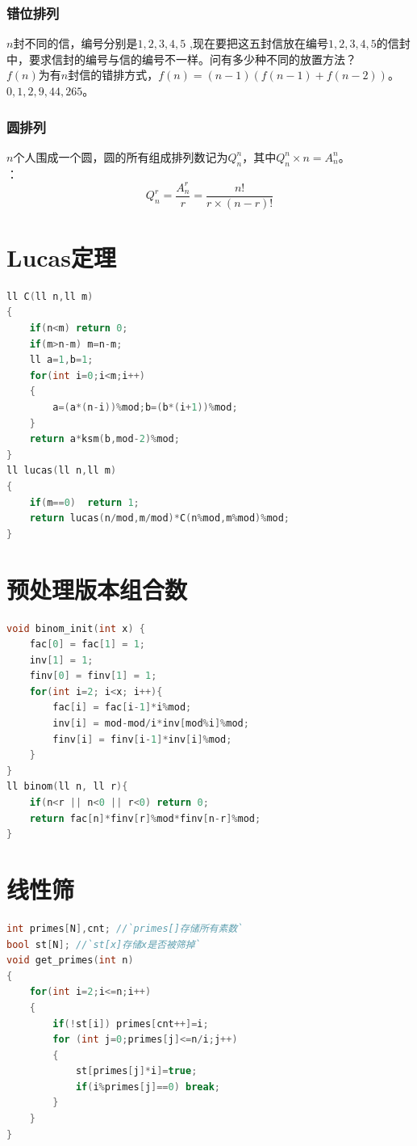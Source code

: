 \documentclass[a4paper]{book}
\begin{document}
\subsubsection{错位排列}
\indent$n$封不同的信，编号分别是$1,2,3,4,5$ ,现在要把这五封信放在编号$1,2,3,4,5$的信封中，要求信封的编号与信的编号不一样。问有多少种不同的放置方法？\\
\indent$f(n)$为有$n$封信的错排方式，$f(n)=(n-1)(f(n-1)+f(n-2))$。\\
$0,1,2,9,44,265$。
\subsubsection{圆排列}
\indent$n$个人围成一个圆，圆的所有组成排列数记为$Q_n^{n}$，其中$Q_n^{n} \times n=A_n^n$。\\
：
$$
Q_n^r=\frac{A_n^r}{r}=\frac{n!}{r\times(n-r)!}
$$
\section{Lucas定理}
\begin{lstlisting}[language=c++]
ll C(ll n,ll m)
{
    if(n<m) return 0;
    if(m>n-m) m=n-m;
    ll a=1,b=1;
    for(int i=0;i<m;i++)
    {
        a=(a*(n-i))%mod;b=(b*(i+1))%mod;
    }
    return a*ksm(b,mod-2)%mod;
}
ll lucas(ll n,ll m)
{
    if(m==0)  return 1;
    return lucas(n/mod,m/mod)*C(n%mod,m%mod)%mod;
}
\end{lstlisting}
\section{预处理版本组合数}
\begin{lstlisting}[language=c++]
void binom_init(int x) {
    fac[0] = fac[1] = 1;
    inv[1] = 1;
    finv[0] = finv[1] = 1;
    for(int i=2; i<x; i++){
        fac[i] = fac[i-1]*i%mod;
        inv[i] = mod-mod/i*inv[mod%i]%mod;
        finv[i] = finv[i-1]*inv[i]%mod;
    }
}
ll binom(ll n, ll r){
    if(n<r || n<0 || r<0) return 0;
    return fac[n]*finv[r]%mod*finv[n-r]%mod;
}
\end{lstlisting}
\section{线性筛}
\begin{lstlisting}[language=c++,escapeinside=``]
int primes[N],cnt; //`primes[]存储所有素数`
bool st[N]; //`st[x]存储x是否被筛掉`
void get_primes(int n)
{
    for(int i=2;i<=n;i++)
    {
        if(!st[i]) primes[cnt++]=i;
        for (int j=0;primes[j]<=n/i;j++)
        {
            st[primes[j]*i]=true;
            if(i%primes[j]==0) break;
        }
    }
}
\end{lstlisting}
\end{document}
